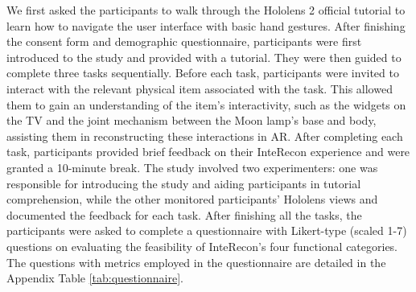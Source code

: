 We first asked the participants to walk through the Hololens 2 official tutorial to learn how to navigate the user interface with basic hand gestures. 
After finishing the consent form and demographic questionnaire, participants were first introduced to the study and provided with a tutorial. 
They were then guided to complete three tasks sequentially. 
Before each task, participants were invited to interact with the relevant physical item associated with the task. 
This allowed them to gain an understanding of the item's interactivity, such as the widgets on the TV and the joint mechanism between the Moon lamp's base and body, assisting them in reconstructing these interactions in AR.
After completing each task, participants provided brief feedback on their InteRecon experience and were granted a 10-minute break.
The study involved two experimenters: one was responsible for introducing the study and aiding participants in tutorial comprehension, while the other monitored participants' Hololens views and documented the feedback for each task. 
After finishing all the tasks, the participants were asked to complete a questionnaire with Likert-type (scaled 1-7) questions on evaluating the feasibility of InteRecon's four functional categories.
The questions with metrics employed in the questionnaire are detailed in the Appendix Table \ref{tab:questionnaire}.














